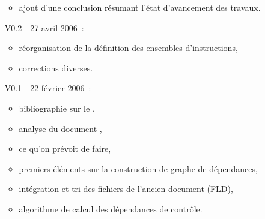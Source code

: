 \begin{small}
\begin{enumerate}
\begin{itemize}
      \item ajout d'une conclusion résumant l'état d'avancement des travaux.
    \end{itemize}
  \item[V0.2 - ] 27 avril 2006~:
    \begin{itemize}
      \item réorganisation de la définition des ensembles d'instructions,
      \item corrections diverses.
    \end{itemize}
  \item[V0.1 - ] 22 février 2006~:
    \begin{itemize}
      \item bibliographie sur le \slicing,
      \item analyse du document \cite{baudinImpact},
      \item ce qu'on prévoit de faire,
      \item premiers éléments sur la construction de graphe de dépendances,
      \item intégration et tri des fichiers de l'ancien document (FLD),
      \item algorithme de calcul des dépendances de contrôle.
    \end{itemize}
\end{enumerate}
\end{small}
\cleardoublepage
\tableofcontents
\cleardoublepage
\cleardoublepage
\cleardoublepage
\cleardoublepage
\cleardoublepage
\appendix
\cleardoublepage 
\cleardoublepage 
\cleardoublepage 
\cleardoublepage 
\cleardoublepage


\cleardoublepage
\printindex
